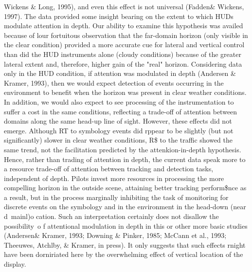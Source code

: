 \documentclass[utf8,bachelor,manualbib]{gradu3}
\begin{document}
Wickens \& Long, 1995), and even this effect is not universal (Fadden\& Wickens,
1997).
The data provided some insight bearing on the extent to which HUDs modulate
attention in depth. Our ability to examine this hypothesis was availed because of
lour fortuitous observation that the far-domain horizon (only visible in the clear
condition) provided a more accurate cue for lateral and vertical control than did the
HUD instruments alone (cloudy conditions) because of the greater lateral extent
and, therefore, higher gain of the "real" horizon. Considering data only in the HUD
condition, if attention was modulated in depth (Andersen \& Kramer, 1993), then
we would expect detection of events occurring in the environment to benefit when
the horizon was present in clear weather conditions. In addition, we would also
expect to see processing of the instrumentation to suffer a cost in the same
conditions, reflecting a trade-off of attention between domains along the same
head-up line of sight. However, these effects did not emerge. Although RT to
symbology events did rppear to be slightly (but not significantly) slower in clear
weather conditions, R\$ to the traffic showed the same trend, not the facilitation
predicted by the attenkion-in-depth hypothesis. Hence, rather than trading of
attention in depth, the current data speak more to a resource trade-off of attention
between tracking and detection tasks, independent of depth. Pilots invest more
resources in processing the more compelling horizon in the outside scene, attaining
better tracking perform\$nce as a result, but in the process marginally inhibiting the
task of monitoring for discrete events on the symbology and in the environment in
the head-down (near d~mainl)o cation. Such an interpretation certainly does not
disallow the possibility~o f attentional modulation in depth in this or other more
basic studies (Andersen\& Kramer, 1993; Downing \& Pinker, 1985; McCann et al.,
1993; Theeuwes, Atchlby, \& Kramer, in press). It only suggests that such effects
rnight have been dorniriated here by the overwhelming effect of vertical location
of the display. \citep{ververs1998}
\end{document}
